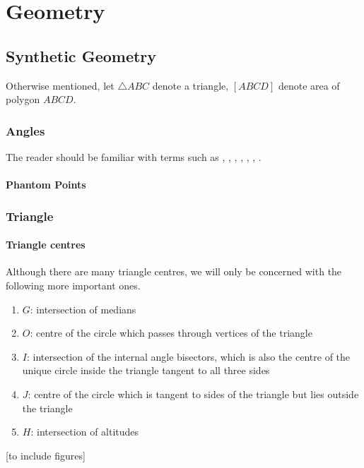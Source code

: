 \part{Geometry}
\chapter{Synthetic Geometry}
Otherwise mentioned, let $\triangle ABC$ denote a triangle, $[ABCD]$ denote area of polygon $ABCD$.

\section{Angles}
The reader should be familiar with terms such as , , , , , , .

\subsection{Phantom Points}

\pagebreak

\section{Triangle}
\subsection{Triangle centres}
Although there are many triangle centres, we will only be concerned with the following more important ones.

\begin{enumerate}
\item {} $G$: intersection of medians
\item {} $O$: centre of the circle which passes through vertices of the triangle
\item {} $I$: intersection of the internal angle bisectors, which is also the centre of the unique circle inside the triangle tangent to all three sides
\item {} $J$: centre of the circle which is tangent to sides of the triangle but lies outside the triangle
\item {} $H$: intersection of altitudes
\end{enumerate}

[to include figures]

